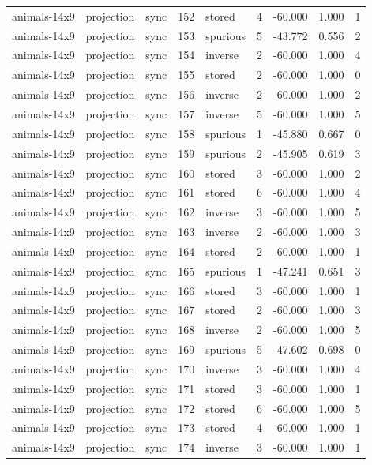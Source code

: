 \begin{tabular}{lllrlrrrr}
animals-14x9 & projection & sync & 152 & stored & 4 & -60.000 & 1.000 & 1 \\
animals-14x9 & projection & sync & 153 & spurious & 5 & -43.772 & 0.556 & 2 \\
animals-14x9 & projection & sync & 154 & inverse & 2 & -60.000 & 1.000 & 4 \\
animals-14x9 & projection & sync & 155 & stored & 2 & -60.000 & 1.000 & 0 \\
animals-14x9 & projection & sync & 156 & inverse & 2 & -60.000 & 1.000 & 2 \\
animals-14x9 & projection & sync & 157 & inverse & 5 & -60.000 & 1.000 & 5 \\
animals-14x9 & projection & sync & 158 & spurious & 1 & -45.880 & 0.667 & 0 \\
animals-14x9 & projection & sync & 159 & spurious & 2 & -45.905 & 0.619 & 3 \\
animals-14x9 & projection & sync & 160 & stored & 3 & -60.000 & 1.000 & 2 \\
animals-14x9 & projection & sync & 161 & stored & 6 & -60.000 & 1.000 & 4 \\
animals-14x9 & projection & sync & 162 & inverse & 3 & -60.000 & 1.000 & 5 \\
animals-14x9 & projection & sync & 163 & inverse & 2 & -60.000 & 1.000 & 3 \\
animals-14x9 & projection & sync & 164 & stored & 2 & -60.000 & 1.000 & 1 \\
animals-14x9 & projection & sync & 165 & spurious & 1 & -47.241 & 0.651 & 3 \\
animals-14x9 & projection & sync & 166 & stored & 3 & -60.000 & 1.000 & 1 \\
animals-14x9 & projection & sync & 167 & stored & 2 & -60.000 & 1.000 & 3 \\
animals-14x9 & projection & sync & 168 & inverse & 2 & -60.000 & 1.000 & 5 \\
animals-14x9 & projection & sync & 169 & spurious & 5 & -47.602 & 0.698 & 0 \\
animals-14x9 & projection & sync & 170 & inverse & 3 & -60.000 & 1.000 & 4 \\
animals-14x9 & projection & sync & 171 & stored & 3 & -60.000 & 1.000 & 1 \\
animals-14x9 & projection & sync & 172 & stored & 6 & -60.000 & 1.000 & 5 \\
animals-14x9 & projection & sync & 173 & stored & 4 & -60.000 & 1.000 & 1 \\
animals-14x9 & projection & sync & 174 & inverse & 3 & -60.000 & 1.000 & 1 \\

\end{tabular}
